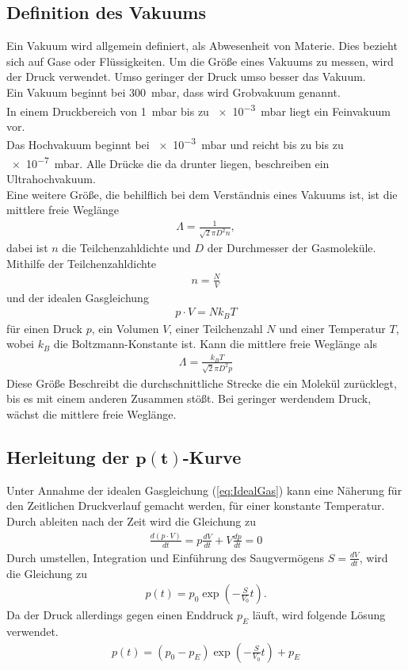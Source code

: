 \subsection{Definition des Vakuums}
Ein Vakuum wird allgemein definiert, als Abwesenheit von Materie.
Dies bezieht sich auf Gase oder Flüssigkeiten. Um die Größe eines Vakuums zu messen, wird der Druck verwendet. Umso geringer der Druck umso besser das Vakuum.\\
Ein Vakuum beginnt bei \SI{300}{\milli\bar}, dass wird Grobvakuum genannt.\\
In einem Druckbereich von \SI{1}{\milli\bar} bis zu \SI{e-3}{\milli\bar} liegt ein Feinvakuum vor.\\
Das Hochvakuum beginnt bei \SI{e-3}{\milli\bar} und reicht bis zu bis zu \SI{e-7}{\milli\bar}. Alle Drücke die da drunter liegen, beschreiben ein Ultrahochvakuum.\\
Eine weitere Größe, die behilflich bei dem Verständnis eines Vakuums ist, ist die mittlere freie Weglänge
\begin{align}
\Lambda = \frac{1}{\sqrt{2}\pi D^2n},
\end{align}
dabei ist $n$ die Teilchenzahldichte und $D$ der Durchmesser der Gasmoleküle. Mithilfe der Teilchenzahldichte 
\begin{align}
n=\frac{N}{V}
\end{align}
und der idealen Gasgleichung
\begin{align}
p\cdot V = N k_B T \label{eq:IdealGas}
\end{align}
für einen Druck $p$, ein Volumen $V$, einer Teilchenzahl $N$ und einer Temperatur $T$, wobei $k_B$ die Boltzmann-Konstante ist.
Kann die mittlere freie Weglänge als
\begin{align}
\Lambda = \frac{k_BT}{\sqrt{2}\pi D^2p}
\end{align} 
Diese Größe Beschreibt die durchschnittliche Strecke die ein Molekül zurücklegt, bis es mit einem anderen Zusammen stößt. Bei geringer werdendem Druck, wächst die mittlere freie Weglänge.

\subsection[Herleitung der $p(t)$-Kurve]{Herleitung der $\mathbf{p(t)}$-Kurve}
Unter Annahme der idealen Gasgleichung (\ref{eq:IdealGas})
kann eine Näherung für den Zeitlichen Druckverlauf gemacht werden, für einer konstante Temperatur.
Durch ableiten nach der Zeit wird die Gleichung zu
\begin{align}
\frac{d\left(p\cdot V \right)}{dt}=p\frac{dV}{dt}+V\frac{dp}{dt}=0
\end{align}
Durch umstellen, Integration und Einführung des Saugvermögens $S=\frac{dV}{dt}$, wird die Gleichung zu
\begin{align}
p(t) = p_0 \exp\left(-\frac{S}{V_0}t\right).
\end{align}
Da der Druck allerdings gegen einen Enddruck $p_E$ läuft, wird folgende Lösung verwendet.
\begin{align}
p(t) = \left( p_0-p_E \right) \exp\left(-\frac{S}{V_0}t\right) + p_E
\end{align}

